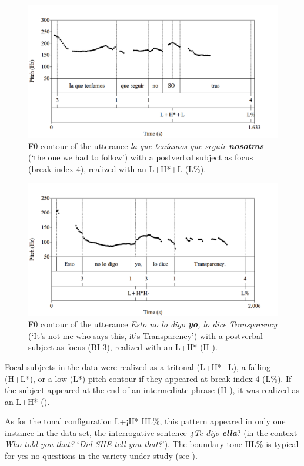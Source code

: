 \documentclass[output=paper]{langsci/langscibook}
\begin{document}
\begin{figure}[p]
\includegraphics[width=\textwidth]{figures/pes-img8.png}
\caption{F0 contour of the utterance \textit{la que teníamos que seguir \textbf{nosotras}} (‘the one we had to follow’) with a postverbal subject as focus (break index 4), realized with an L+H*+L (L\%).\label{fig:pes:8}}
\end{figure}

\begin{figure}[p]
\includegraphics[width=\textwidth]{figures/pes-img9.png}
\caption{F0 contour of the utterance \textit{Esto no lo digo \textbf{yo}, lo dice Transparency} (‘It’s not me who says this, it’s Transparency’) with a postverbal subject as focus (BI 3), realized with an L+H* (H-).\label{fig:pes:9}}
\end{figure}%

Focal subjects in the data were realized as a tritonal (L+H*+L), a falling (H+L*), or a low (L*) pitch contour if they appeared at break index 4 (L\%). If the subject appeared at the end of an intermediate phrase (H-), it was realized as an L+H* ().

As for the tonal configuration L+¡H* HL\%, this pattern appeared in only one instance in the data set, the interrogative sentence \textit{¿Te dijo} \textbf{\textit{ella}}? (in the context \textit{Who told you that?} ‘\textit{Did SHE} \textit{tell you that?}’). The boundary tone HL\% is typical for yes-no questions in the variety under study (see \citealt{Gabriel2010incollection}).
\end{document}
